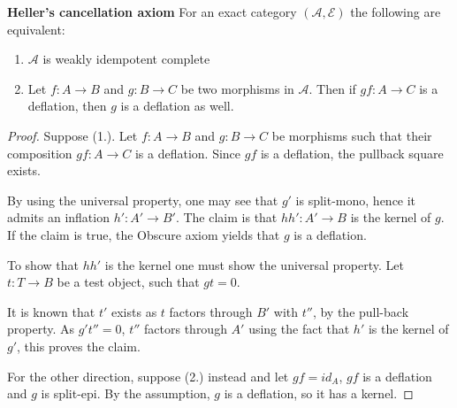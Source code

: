     \begin{prop} \textbf{Heller's cancellation axiom}
        For an exact category $(\mathcal{A},\mathcal{E})$ the following are equivalent:
        \begin{enumerate}
            \item $\mathcal{A}$ is weakly idempotent complete
            \item Let $f: A\rightarrow B$ and $g: B\rightarrow C$ be two morphisms in $\mathcal{A}$. Then if $gf:A\rightarrow C$ is a deflation, then $g$ is a deflation as well.
        \end{enumerate}
    \end{prop}

    \begin{proof}
        Suppose (1.). Let $f:A\rightarrow B$ and $g:B\rightarrow C$ be morphisms such that their composition $gf:A\rightarrow C$ is a deflation. Since $gf$ is a deflation, the pullback square exists.

        \begin{center}
        \end{center}

        By using the universal property, one may see that $g'$ is split-mono, hence it admits an inflation $h':A'\rightarrow B'$. The claim is that $hh':A'\rightarrow B$ is the kernel of $g$. If the claim is true, the Obscure axiom yields that $g$ is a deflation.

        To show that $hh'$ is the kernel one must show the universal property. Let $t:T\rightarrow B$ be a test object, such that $gt=0$.

        \begin{center}
        \end{center}

       It is known that $t'$ exists as $t$ factors through $B'$ with $t''$, by the pull-back property. As $g't''=0$, $t''$ factors through $A'$ using the fact that $h'$ is the kernel of $g'$, this proves the claim.
        
        For the other direction, suppose (2.) instead and let $gf=id_A$,  $gf$ is a deflation and $g$ is split-epi. By the assumption, $g$ is a deflation, so it has a kernel.
    \end{proof}


